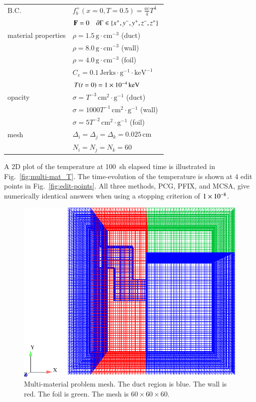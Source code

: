 \documentclass[preprint,12pt]{elsarticle}
\newcommand{\Cv}{\ensuremath{C_{v}}}
\newcommand{\Di}{\ensuremath{\Delta_i}}
\newcommand{\Dj}{\ensuremath{\Delta_j}}
\newcommand{\Dk}{\ensuremath{\Delta_k}}
\begin{document}
\begin{center}
  \begin{tabular}{ll}\hline
    B.C. & $f_b^{+}(x=0,T=0.5) = \frac{ac}{4}T^4$\\ & $\mathbf{F} =
    0\quad \partial\Gamma \in \{x^{+}, y^{-}, y^{+}, z^{-}, z^{+}\}$
    \\  material properties & $\rho =
    1.5\,\text{g}\cdot\text{cm}^{-3}$ (duct) \\ & $\rho =
    8.0\,\text{g}\cdot\text{cm}^{-3}$ (wall) \\ & $\rho =
    4.0\,\text{g}\cdot\text{cm}^{-3}$ (foil) \\ & $\Cv =
    0.1\,\text{Jerks}\cdot\text{g}^{-1}\cdot\text{keV}^{-1}$\\ &
    $T(t=0) = 1\times 10^{-4}\,\text{keV}$\\  opacity & $\sigma =
    T^{-3}\,\text{cm}^2\cdot\text{g}^{-1}$ (duct) \\ & $\sigma =
    1000T^{-1}\,\text{cm}^2\cdot\text{g}^{-1}$ (wall) \\ & $\sigma =
    5T^{-2}\,\text{cm}^2\cdot\text{g}^{-1}$ (foil) \\  mesh & $\Di =
    \Dj = \Dk = 0.025\,\text{cm}$ \\ & $N_i = N_j = N_k = 60$
    \\ \hline
  \end{tabular}
\end{center}

A 2D plot of the temperature at 100~sh elapsed time is illustrated in
Fig.~\ref{fig:multi-mat_T}.  The time-evolution of the temperature is
shown at 4 edit points in Fig.~\ref{fig:edit-points}.  All three
methods, PCG, PFIX, and MCSA, give numerically identical answers when
using a stopping criterion of $1\times 10^{-8}$.

\begin{figure}[h!]
  \centerline{ \includegraphics[width=5in,clip]{mesh.pdf}}
  \caption{Multi-material problem mesh.  The duct region is blue.  The
    wall is red.  The foil is green.  The mesh is $60\times 60\times
    60$.}
  \label{fig:multi-mat-mesh}
\end{figure}
\end{document}
